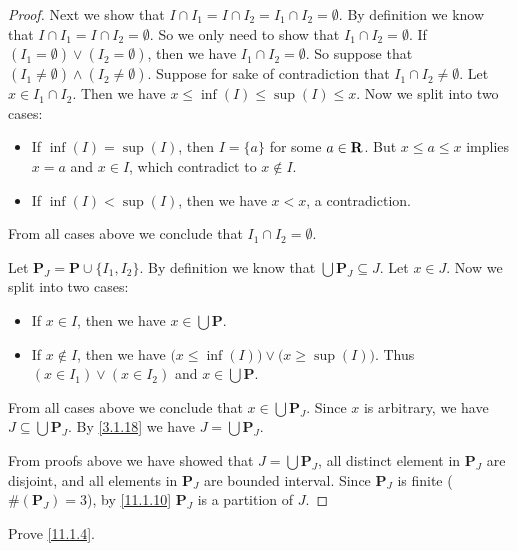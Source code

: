 \begin{proof}
  Next we show that \(I \cap I_1 = I \cap I_2 = I_1 \cap I_2 = \emptyset\).
  By definition we know that \(I \cap I_1 = I \cap I_2 = \emptyset\).
  So we only need to show that \(I_1 \cap I_2 = \emptyset\).
  If \((I_1 = \emptyset) \lor (I_2 = \emptyset)\), then we have \(I_1 \cap I_2 = \emptyset\).
  So suppose that \((I_1 \neq \emptyset) \land (I_2 \neq \emptyset)\).
  Suppose for sake of contradiction that \(I_1 \cap I_2 \neq \emptyset\).
  Let \(x \in I_1 \cap I_2\).
  Then we have \(x \leq \inf(I) \leq \sup(I) \leq x\).
  Now we split into two cases:
  \begin{itemize}
    \item If \(\inf(I) = \sup(I)\), then \(I = \{a\}\) for some \(a \in \mathbf{R}\).
          But \(x \leq a \leq x\) implies \(x = a\) and \(x \in I\), which contradict to \(x \notin I\).
    \item If \(\inf(I) < \sup(I)\), then we have \(x < x\), a contradiction.
  \end{itemize}
  From all cases above we conclude that \(I_1 \cap I_2 = \emptyset\).

  Let \(\mathbf{P}_J = \mathbf{P} \cup \{I_1, I_2\}\).
  By definition we know that \(\bigcup \mathbf{P}_J \subseteq J\).
  Let \(x \in J\).
  Now we split into two cases:
  \begin{itemize}
    \item If \(x \in I\), then we have \(x \in \bigcup \mathbf{P}\).
    \item If \(x \notin I\), then we have \(\big(x \leq \inf(I)\big) \lor \big(x \geq \sup(I)\big)\).
          Thus \((x \in I_1) \lor (x \in I_2)\) and \(x \in \bigcup \mathbf{P}\).
  \end{itemize}
  From all cases above we conclude that \(x \in \bigcup \mathbf{P}_J\).
  Since \(x\) is arbitrary, we have \(J \subseteq \bigcup \mathbf{P}_J\).
  By \cref{3.1.18} we have \(J = \bigcup \mathbf{P}_J\).

  From proofs above we have showed that \(J = \bigcup \mathbf{P}_J\), all distinct element in \(\mathbf{P}_J\) are disjoint, and all elements in \(\mathbf{P}_J\) are bounded interval.
  Since \(\mathbf{P}_J\) is finite (\(\#(\mathbf{P}_J) = 3\)), by \cref{11.1.10} \(\mathbf{P}_J\) is a partition of \(J\).
\end{proof}

\exercisesection

\begin{exercise}\label{ex 11.1.1}
  Prove \cref{11.1.4}.
\end{exercise}

